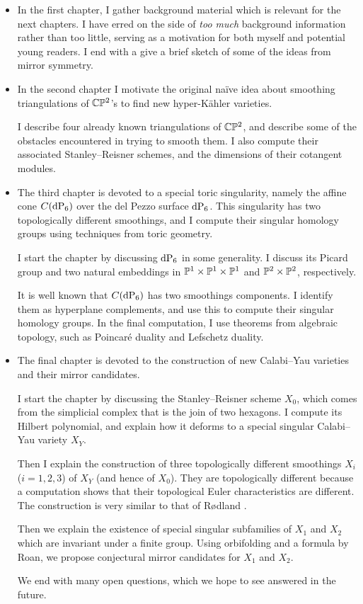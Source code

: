 \begin{itemize}
\item In the first chapter, I gather background material which is relevant for the next chapters. I have erred on the side of \emph{too much} background information rather than too little, serving as a motivation for both myself and potential young readers. I end with a give a brief sketch of some of the ideas from mirror symmetry.

\item In the second chapter I motivate the original naïve idea about smoothing triangulations of $\C \P^2$'s to find new hyper-Kähler varieties.

I describe four already known triangulations of $\C \P^2$, and describe some of the obstacles encountered in trying to smooth them. I also compute their associated Stanley--Reisner schemes, and the dimensions of their cotangent modules.

\item The third chapter is devoted to a special toric singularity, namely the affine cone $C(\dP6)$ over the del Pezzo surface $\dP6$. This singularity has two topologically different smoothings, and I compute their singular homology groups using techniques from toric geometry.

I start the chapter by discussing $\dP6$ in some generality. I discuss its Picard group and two natural embeddings in $\P^1 \times \P^1 \times \P^1$ and $\P^2 \times \P^2$, respectively.

It is well known that $C(\dP6)$ has two smoothings components. I identify them as hyperplane complements, and use this to compute their singular homology groups. In the final computation, I use theorems from algebraic topology, such as Poincaré duality and Lefschetz duality. 

\item The final chapter is devoted to the construction of new Calabi--Yau varieties and their mirror candidates.

I start the chapter by discussing the Stanley--Reisner scheme $X_0$, which comes from the simplicial complex that is the join of two hexagons. I compute its Hilbert polynomial, and explain how it deforms to a special singular Calabi--Yau variety $X_Y$.

Then I explain the construction of three topologically different smoothings $X_i$ ($i=1,2,3$) of $X_Y$ (and hence of $X_0$). They are topologically different because a \MM computation shows that their topological Euler characteristics are different. The construction is very similar to that of Rødland \cite{rodland_pfaffian}.

Then we explain the existence of special singular subfamilies of $X_1$ and $X_2$ which are invariant under a finite group. Using orbifolding and a formula by Roan, we propose conjectural mirror candidates for $X_1$ and $X_2$.

We end with many open questions, which we hope to see answered in the future.
\end{itemize}

